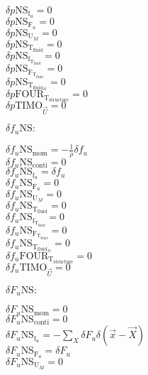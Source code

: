\documentclass[10pt]{article} %
\begin{document}
\begin{center}
	$\delta p \text{NS}_{\text{f}_u} = 0$\\
	$\delta p \text{NS}_{\text{F}_u} = 0$\\
	$\delta p \text{NS}_{\text{U}_M} = 0$\\
	$\delta p \text{NS}_{\text{T}_{\text{fluid}}} = 0$\\
	$\delta p \text{NS}_{\text{f}_{\text{T}_{\text{fluid}}}} = 0$\\
	$\delta p \text{NS}_{\text{F}_{\text{T}_{\text{fluid}}}} = 0$\\
	$\delta p \text{NS}_{\text{T}_{\text{fluid}_M}} = 0$\\
	$\delta p \text{FOUR}_{\text{T}_{\text{structure}}} = 0$\\
	$\delta p \text{TIMO}_{\vec{U}} = 0$\\
\begin{flushleft}
	$\delta f_u \text{NS}:$
\end{flushleft}
	$\delta f_u \text{NS}_{\text{mom}} =  -\frac{1}{\rho}\delta f_u$\\
	$\delta f_u \text{NS}_{\text{conti}} = 0$\\
	$\delta f_u \text{NS}_{\text{f}_u} = \delta f_u$\\
	$\delta f_u \text{NS}_{\text{F}_u} = 0$\\
	$\delta f_u \text{NS}_{\text{U}_M} = 0$\\
	$\delta f_u \text{NS}_{\text{T}_{\text{fluid}}} = 0$\\
	$\delta f_u \text{NS}_{\text{f}_{\text{T}_{\text{fluid}}}} = 0$\\
	$\delta f_u \text{NS}_{\text{F}_{\text{T}_{\text{fluid}}}} = 0$\\
	$\delta f_u \text{NS}_{\text{T}_{\text{fluid}_M}} = 0$\\
	$\delta f_u \text{FOUR}_{\text{T}_{\text{structure}}} = 0$\\
	$\delta f_u \text{TIMO}_{\vec{U}} = 0$\\
\begin{flushleft}
	$\delta F_u \text{NS}:$
\end{flushleft}
	$\delta F_u \text{NS}_{\text{mom}} =  0$\\
	$\delta F_u \text{NS}_{\text{conti}} = 0$\\
	$\delta F_u \text{NS}_{\text{f}_u} = -\sum_X \delta F_u \delta (\vec{x}-\vec{X})$\\
	$\delta F_u \text{NS}_{\text{F}_u} = \delta F_u$\\
	$\delta F_u \text{NS}_{\text{U}_M} = 0$\\

\end{center}
\end{document}
